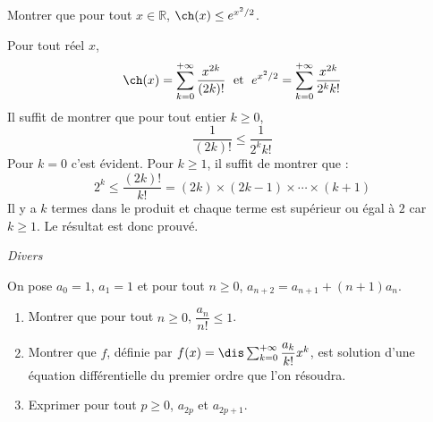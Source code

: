\documentclass[a4paper,10pt]{report}
\begin{document}
\begin{Exercice}{} Montrer que pour tout $x \in \mathbb{R}$, $\ch(x) \leq e^{x^2/2}$.
\end{Exercice}

\corr Pour tout réel $x$,
$$ \ch(x) = \sum_{k=0}^{+ \infty} \dfrac{x^{2k}}{(2k)!} \; \hbox{ et } \; e^{x^2/2} = \sum_{k=0}^{+ \infty} \dfrac{x^{2k}}{2^k k!}$$
Il suffit de montrer que pour tout entier $k \geq 0$,
$$ \dfrac{1}{(2k)!} \leq \dfrac{1}{2^k	k!}$$
Pour $k=0$ c'est évident. Pour $k \geq 1$, il suffit de montrer que :
$$ 2^k \leq \dfrac{(2k)!}{k!} = (2k) \times (2k-1) \times \cdots \times (k+1)$$
Il y a $k$ termes dans le produit et chaque terme est supérieur ou égal à $2$ car $k \geq 1$. Le résultat est donc prouvé.

\medskip

\begin{center}
\textit{{ {\large Divers}}}
\end{center}

\medskip


\begin{Exercice}{} On pose $a_0=1$, $a_1=1$ et pour tout $n \geq 0$, $a_{n+2} = a_{n+1} + (n+1)a_n$.
\begin{enumerate}
\item Montrer que pour tout $n \geq 0$, $\dfrac{a_n}{n!} \leq 1$.
\item Montrer que $f$, définie par $f(x) = \dis \sum_{k=0}^{+ \infty} \dfrac{a_k}{k!}x^k$, est solution d'une équation différentielle du premier ordre que l'on résoudra.
\item Exprimer pour tout $p \geq 0$, $a_{2p}$ et $a_{2p+1}$.
\end{enumerate}
\end{Exercice}
\end{document}
